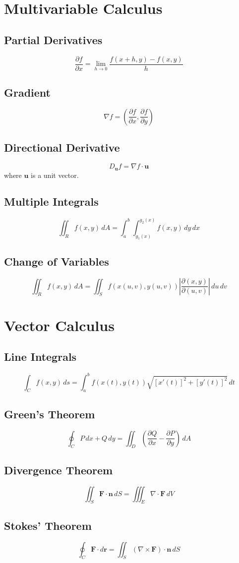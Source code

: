 \documentclass[11pt]{article}
\begin{document}
\section{Multivariable Calculus}

\subsection{Partial Derivatives}
$$\frac{\partial f}{\partial x} = \lim_{h \to 0} \frac{f(x+h,y) - f(x,y)}{h}$$

\subsection{Gradient}
$$\nabla f = \left(\frac{\partial f}{\partial x}, \frac{\partial f}{\partial y}\right)$$

\subsection{Directional Derivative}
$$D_{\mathbf{u}} f = \nabla f \cdot \mathbf{u}$$
where $\mathbf{u}$ is a unit vector.

\subsection{Multiple Integrals}
$$\iint_R f(x,y) \, dA = \int_a^b \int_{g_1(x)}^{g_2(x)} f(x,y) \, dy \, dx$$

\subsection{Change of Variables}
$$\iint_R f(x,y) \, dA = \iint_S f(x(u,v), y(u,v)) \left|\frac{\partial(x,y)}{\partial(u,v)}\right| \, du \, dv$$

\section{Vector Calculus}

\subsection{Line Integrals}
$$\int_C f(x,y) \, ds = \int_a^b f(x(t), y(t)) \sqrt{[x'(t)]^2 + [y'(t)]^2} \, dt$$

\subsection{Green's Theorem}
$$\oint_C P \, dx + Q \, dy = \iint_D \left(\frac{\partial Q}{\partial x} - \frac{\partial P}{\partial y}\right) \, dA$$

\subsection{Divergence Theorem}
$$\iint_S \mathbf{F} \cdot \mathbf{n} \, dS = \iiint_E \nabla \cdot \mathbf{F} \, dV$$

\subsection{Stokes' Theorem}
$$\oint_C \mathbf{F} \cdot d\mathbf{r} = \iint_S (\nabla \times \mathbf{F}) \cdot \mathbf{n} \, dS$$
\end{document}

